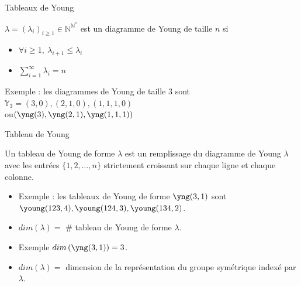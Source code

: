 \documentclass[french]{beamer}
\begin{document}
\begin{frame}{Tableaux de Young}
   \begin{definition}
   $\lambda=(\lambda_i)_{i\geq1} \in \mathbb{N}^{\mathbb{N}^*}$ est un diagramme de Young de taille $n$ si 
   \begin{itemize}
       \item $\forall i\geq1, \  \lambda_{i+1}\leq \lambda_i$
       \item $\sum_{i=1}^\infty \lambda_i=n$
   \end{itemize}
   \end{definition}
   Exemple : les diagrammes de Young de taille 3 sont $\mathbb{Y}_3=(3,\underline{0}),(2,1,\underline{0}),(1,1,1,\underline{0})$
   \\   ou$\left(\yng(3),\yng(2,1),\yng(1,1,1)\right)$
   
 
\end{frame}
\begin{frame}{Tableau de Young}
    \begin{definition}
    Un tableau de Young de forme $\lambda$ est un remplissage du diagramme de Young $\lambda$ avec les entrées $\{1,2,\dots,n\}$ strictement croissant sur chaque ligne et chaque colonne. 
    \end{definition}
    \begin{itemize}
        \item     Exemple : les tableaux de Young de forme $\yng(3,1)$ sont $\young(123,4),\young(124,3),\young(134,2)$. 
    \item$dim(\lambda)=$ \# tableau de Young de forme $\lambda$. 
    \item Exemple  $dim\left(\yng(3,1)\right)=3$.
    \item $dim(\lambda) = $   dimension de  la représentation du groupe symétrique indexé par $\lambda$.
    \end{itemize}
 \end{frame}
\end{document}
